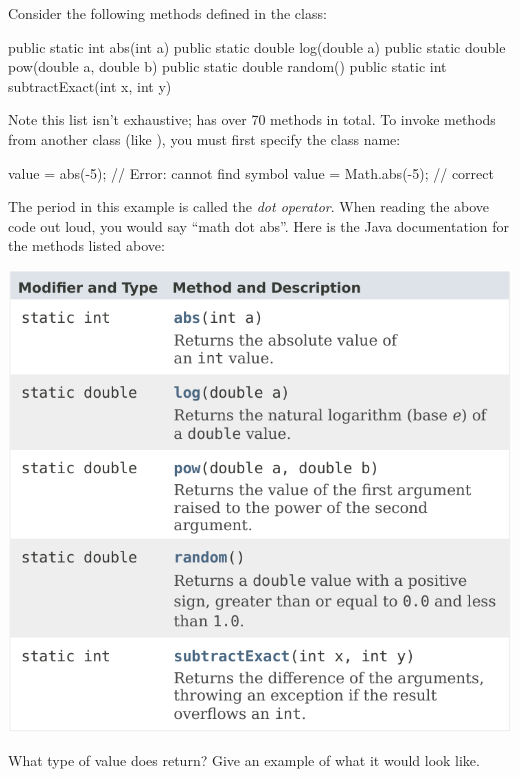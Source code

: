 
Consider the following methods defined in the  class:

\begin{javalst}
    public static int abs(int a)
    public static double log(double a)
    public static double pow(double a, double b)
    public static double random()
    public static int subtractExact(int x, int y)
\end{javalst}

Note this list isn't exhaustive;  has over 70 methods in total.
To invoke methods from another class (like ), you must first specify the class name:

\begin{javalst}
    value = abs(-5);       // Error: cannot find symbol
    value = Math.abs(-5);  // correct
\end{javalst}

The period in this example is called the \emph{dot operator}. When reading the above code out loud, you would say ``math dot abs''.
Here is the Java documentation for the methods listed above:

\begin{center}
\includegraphics[scale=0.90]{math-javadoc.pdf}
\end{center}




\Q What type of value does  return? Give an example of what it would look like.

